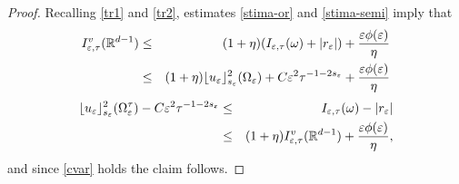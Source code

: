 \documentclass[10pt,a4paper]{amsart}
\def\e{\varepsilon}
\begin{document}
\begin{proof}
Recalling \eqref{tr1} and \eqref{tr2}, estimates \eqref{stima-or} and \eqref{stima-semi} imply that 
\begin{eqnarray*}
I_{\e,\tau}^{\rm v}(\mathbb R^{d-1})&\leq&(1+\eta)(I_{\e,\tau}(\omega)+|r_\e|)+\frac{\e\phi(\e)}{\eta}\\
&\leq&(1+\eta)\lfloor u_\e\rfloor_{s_\e}^2(\Omega_\e)
+C\e^2\tau^{-1-2s_\e}
+\frac{\e\phi(\e)}{\eta}
\end{eqnarray*}
\begin{eqnarray*}
\lfloor u_\e\rfloor_{s_\e}^2(\Omega_\e^\tau)-C\e^2\tau^{-1-2s_\e}&\leq& I_{\e,\tau}(\omega)-|r_\e|\\
&\leq&(1+\eta)I_{\e,\tau}^{\rm v}(\mathbb R^{d-1})+\frac{\e\phi(\e)}{\eta}, 
\end{eqnarray*}
and since \eqref{cvar} holds the claim follows. \end{proof}
\end{document}
